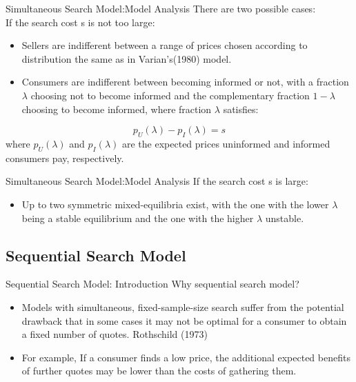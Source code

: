\documentclass[aspectratio=169]{beamer}  %
\begin{document}
\begin{frame}{Simultaneous Search Model:Model Analysis}
    There are two possible cases:\\
    If the search cost s is not too large:
    \begin{itemize}
        \item Sellers are indifferent between a range of prices chosen according to distribution the same as in Varian's(1980) model.
        \item Consumers are indifferent between becoming informed or not, with a fraction $\lambda$ choosing not to become informed and the complementary fraction $1 - \lambda$ choosing to become informed, where fraction $\lambda$ satisfies:
    \end{itemize}
    $$
    p_{U}(\lambda)-p_{I}(\lambda)=s
    $$
    where $p_U(\lambda)$ and $p_I (\lambda)$ are the expected prices uninformed and informed consumers pay, respectively. 
\end{frame}

\begin{frame}{Simultaneous Search Model:Model Analysis}
    If the search cost s is large:
    \begin{itemize}
        \item Up to two symmetric mixed-equilibria exist, with the one with the lower $\lambda$ being a stable equilibrium and the one with the higher $\lambda$ unstable.
    \end{itemize}
\end{frame}

	

\subsection{Sequential Search Model}
\begin{frame}{Sequential Search Model: Introduction}
    Why sequential search model?
    \begin{itemize}
        \item Models with simultaneous, fixed-sample-size search suffer from the potential drawback that in some cases it may not be optimal for a consumer to obtain a fixed number of quotes. Rothschild (1973)
        \item For example, If a consumer finds a low price, the additional expected benefits of further quotes may be lower than the costs of gathering them.
    \end{itemize}
\end{frame}
\end{document}
